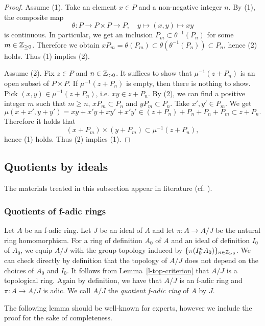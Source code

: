 \begin{proof}
Assume (1). 
Take an element $x \in P$ and a non-negative integer $n$. 
By (1), the composite map 
$$\theta:P \to P \times P \to P, \quad y \mapsto (x, y) \mapsto xy$$
is continuous. 
In particular, we get an inclusion $P_m \subset \theta^{-1}(P_n)$ 
for some $m \in \mathbb{Z}_{\geq 0}$. 
Therefore we obtain $x P_m=\theta(P_m) \subset \theta(\theta^{-1}(P_n)) \subset P_n$, 
hence (2) holds. 
Thus (1) implies (2). 



Assume (2). 
Fix $z \in P$ and $n \in \mathbb{Z}_{> 0}$. 
It suffices to show that $\mu^{-1}(z+P_n)$ is 
an open subset of $P \times P$. 
If $\mu^{-1}(z+P_n)$ is empty, then there is nothing to show. 
Pick $(x, y) \in \mu^{-1}(z+P_n)$, i.e. $xy \in z+P_n$. 
By (2), we can find a positive integer $m$ 
such that $m \geq n$, $xP_m \subset P_n$ and $yP_m \subset P_n$. 
Take $x', y' \in P_m$. 
We get 
$$\mu(x+x', y+y')=xy+x'y+xy'+x'y' \in (z+P_n)+P_n+P_n+P_m \subset z+P_n.$$
Therefore it holds that 
$$(x+P_m) \times (y+P_m) \subset \mu^{-1}(z+P_n),$$ 
hence (1) holds. Thus (2) implies (1).  
\end{proof}

\subsection{Quotients by ideals}


The materials treated in this subsection 
appear in literature (cf. \cite[(1.4.1)]{Hub96}). 

\subsubsection{Quotients of f-adic rings}\label{ss-quot-fad}

Let $A$ be an f-adic ring. 
Let $J$ be an ideal of $A$ and let $\pi:A \to A/J$ be the natural ring homomorphism. 
For a ring of definition $A_0$ of $A$ and 
an ideal of definition $I_0$ of $A_0$, 
we equip $A/J$ with the group topology induced by $\{\pi(I_0^nA_0)\}_{n \in \mathbb{Z}_{>0}}$. 
We can check directly by definition that 
the topology of $A/J$ does not depend on the choices of $A_0$ and $I_0$. 
It follows from Lemma~\ref{l-top-criterion} that $A/J$ is a topological ring. 
Again by definition, 
we have that $A/J$ is an f-adic ring and $\pi:A \to A/J$ is adic. 
We call $A/J$ the {\em quotient f-adic ring} of $A$ by $J$. 

The following lemma should be well-known for experts, 
however we include the proof for the sake of completeness. 

